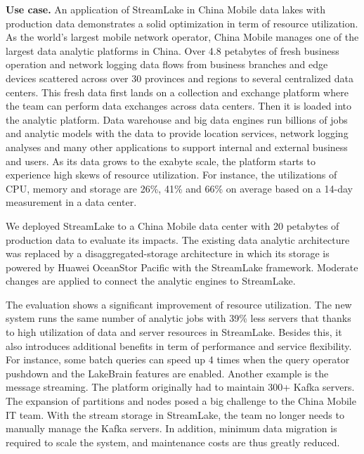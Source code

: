 \noindent \textbf{Use case.}
An application of StreamLake in China Mobile data lakes with production data demonstrates a solid optimization in term of resource utilization. As the world's largest mobile network operator, China Mobile manages one of the largest data analytic platforms in China. Over 4.8 petabytes of fresh business operation and network logging data flows from business branches and edge devices scattered across over 30 provinces and regions to several centralized data centers. This fresh data first lands on a collection and exchange platform where the team can perform data exchanges across data centers. Then it is loaded into the analytic platform. Data warehouse and big data engines run billions of jobs and analytic models with the data to provide location services, network logging analyses and many other applications to support internal and external business and users. As its data grows to the exabyte scale, the platform starts to experience high skews of resource utilization. For instance, the utilizations of CPU, memory and storage are 26\%, 41\% and 66\% on average based on a 14-day measurement in a data center.

We deployed StreamLake to a China Mobile data center with 20 petabytes of production data to evaluate its impacts. The existing data analytic architecture was replaced by a disaggregated-storage architecture in which its storage is powered by Huawei OceanStor Pacific with the StreamLake framework. Moderate changes are applied to connect the analytic engines to StreamLake.

The evaluation shows a significant improvement of resource utilization. The new system runs the same number of analytic jobs with 39\% less servers that thanks to high utilization of data and server resources in StreamLake. Besides this, it also introduces additional benefits in term of performance and service flexibility. For instance, some batch queries can speed up 4 times when the query operator pushdown and the LakeBrain features are enabled. Another example is the message streaming. The platform originally had to maintain 300+ Kafka servers. The expansion of partitions and nodes posed a big challenge to the China Mobile IT team. With the stream storage in StreamLake, the team no longer needs to manually manage the Kafka servers. In addition, minimum data migration is required to scale the system, and maintenance costs are thus greatly reduced. 


